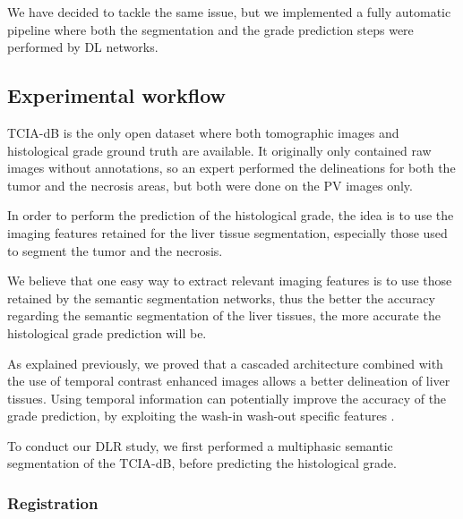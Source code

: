 \documentclass[]{article}
\newcommand{\lmttfont}[1]{{\fontfamily{lmtt}\selectfont #1}}
\begin{document}
We have decided to tackle the same issue, but we implemented a fully
automatic pipeline where both the segmentation and the grade prediction
steps were performed by DL networks.

\subsection{Experimental workflow}\label{experimental-workflow}

\lmttfont{TCIA-dB} is the only open dataset where both tomographic images and
histological grade ground truth are available. It originally only
contained raw images without annotations, so an expert performed the
delineations for both the tumor and the necrosis areas, but both were
done on the PV images only.

In order to perform the prediction of the histological grade, the idea
is to use the imaging features retained for the liver tissue
segmentation, especially those used to segment the tumor and the
necrosis.

We believe that one easy way to extract relevant imaging features is to
use those retained by the semantic segmentation networks, thus the
better the accuracy regarding the semantic segmentation of the liver
tissues, the more accurate the histological grade prediction will be.

As explained previously, we proved that a cascaded architecture combined
with the use of temporal contrast enhanced images allows a better
delineation of liver tissues. Using temporal information can potentially
improve the accuracy of the grade prediction, by exploiting the wash-in
wash-out specific features \cite{Okamoto2012}.

To conduct our DLR study, we first performed a multiphasic
semantic segmentation of the \lmttfont{TCIA-dB}, before predicting the
histological grade.

\subsubsection{Registration}\label{registration}
\end{document}
